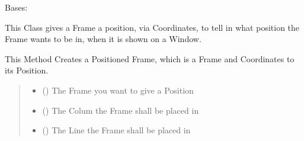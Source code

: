 \documentclass[letterpaper,10pt,english]{sphinxmanual}
\begin{document}
\begin{fulllineitems}
\label{\detokenize{apidoc/src.osm_configurator.view.states:src.osm_configurator.view.states.positioned_frame.PositionedFrame}}
\pysigstartsignatures
{}
\pysigstopsignatures
\sphinxAtStartPar
Bases: 

\sphinxAtStartPar
This Class gives a Frame a position, via Coordinates, to tell in what position the Frame wants to be in, when
it is shown on a Window.

\begin{fulllineitems}
\label{\detokenize{apidoc/src.osm_configurator.view.states:src.osm_configurator.view.states.positioned_frame.PositionedFrame.__init__}}
\pysigstartsignatures
{}
\pysigstopsignatures
\sphinxAtStartPar
This Method Creates a Positioned Frame, which is a Frame and Coordinates to its Position.
\begin{quote}\begin{description}
\begin{itemize}
\item {} 
\sphinxAtStartPar
{} ({\hyperref[\detokenize{apidoc/src.osm_configurator.view.toplevelframes:src.osm_configurator.view.toplevelframes.top_level_frame.TopLevelFrame}]{}}) \textendash{} The Frame you want to give a Position

\item {} 
\sphinxAtStartPar
{} () \textendash{} The Colum the Frame shall be placed in

\item {} 
\sphinxAtStartPar
{} () \textendash{} The Line the Frame shall be placed in


\end{itemize}
\end{description}
\end{quote}
\end{fulllineitems}
\end{fulllineitems}
\end{document}
